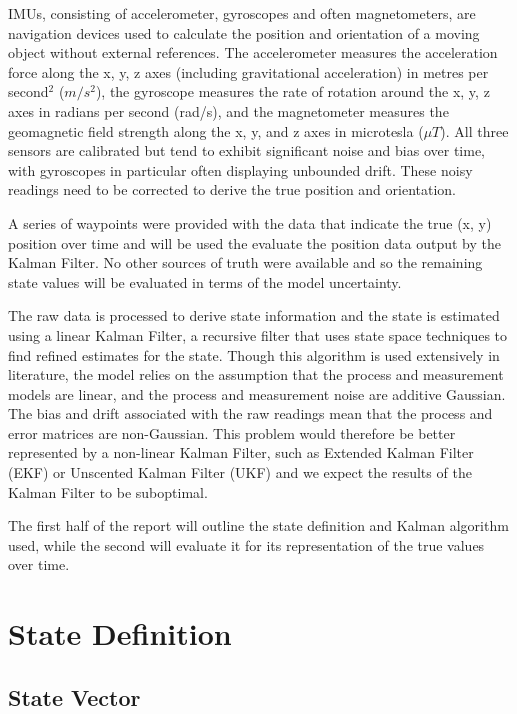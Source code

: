\documentclass[12pt]{article}
\begin{document}
IMUs, consisting of accelerometer, gyroscopes and often magnetometers, are navigation devices used to calculate the position and orientation of a moving object without external references. The accelerometer measures the acceleration force along the x, y, z axes (including gravitational acceleration) in metres per second$^2$ ($m/s^2$), the gyroscope measures the rate of rotation around the x, y, z axes in radians per second (rad/s), and the magnetometer measures the geomagnetic field strength along the x, y, and z axes in microtesla ($\mu T$). All three sensors are calibrated but tend to exhibit significant noise and bias over time, with gyroscopes in particular often displaying unbounded drift. These noisy readings need to be corrected to derive the true position and orientation. 

A series of waypoints were provided with the data that indicate the true (x, y) position over time and will be used the evaluate the position data output by the Kalman Filter. No other sources of truth were available and so the remaining state values will be evaluated in terms of the model uncertainty. 

The raw data is processed to derive state information and the state is estimated using a linear Kalman Filter, a recursive filter that uses state space techniques to find refined estimates for the state. Though this algorithm is used extensively in literature, the model relies on the assumption that the process and measurement models are linear, and the process and measurement noise are additive Gaussian. The bias and drift associated with the raw readings mean that the process and error matrices are non-Gaussian. This problem would therefore be better represented by a non-linear Kalman Filter, such as Extended Kalman Filter (EKF) or Unscented Kalman Filter (UKF) and we expect the results of the Kalman Filter to be suboptimal. 

The first half of the report will outline the state definition and Kalman algorithm used, while the second will evaluate it for its representation of the true values over time. 

\section{State Definition}
\subsection{State Vector}
\end{document}
